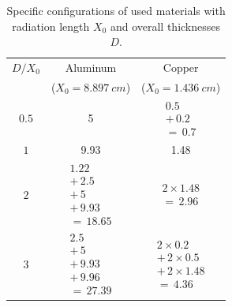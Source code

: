 \documentclass[sn-mathphys-num,iicol]{sn-jnl}
\theoremstyle{thmstyleone}
\theoremstyle{thmstyletwo}
\theoremstyle{thmstylethree}
\begin{document}
\begin{table}\centering
  \renewcommand*{\arraystretch}{1.15}
  \begin{tabular}{c|c|c}
    $D/X_0$ & Aluminum & Copper \\
    & {\fontsize{7}{5}\selectfont ($X_0=\SI{8.897}{cm}$)} & {\fontsize{7}{5}\selectfont ($X_0=\SI{1.436}{cm}$)} \\\hline\rule{0pt}{6ex}
    $0.5$ & \num{5} & $\begin{array}{r}
                \num{0.5} \\
                +\,\num{0.2} \\\hline
                =\,\num{0.7}    
              \end{array}$ \\\hline
    $1$ & \num{9.93} & \num{1.48} \\\hline
    $2$ & $\begin{array}{r}
      \num{1.22} \\
      +\,\num{2.5} \\
      +\,\num{5} \\
      +\,\num{9.93} \\\hline
      =\,\num{18.65}
    \end{array}$ & $\begin{array}{r}
                      2\times\num{1.48} \\\hline
                      =\,\num{2.96}
                    \end{array}$ \\\hline
    $3$ & $\begin{array}{r}
      \num{2.5} \\
      +\,\num{5} \\
      +\,\num{9.93} \\
      +\,\num{9.96} \\\hline
      =\,\num{27.39}
    \end{array}$ & $\begin{array}{r}
                      2\times\num{0.2} \\
                      +\,2\times\num{0.5} \\
                      +\,2\times\num{1.48} \\\hline
                      =\,\num{4.36}
                    \end{array}$ \\\hline
  \end{tabular}\vspace{3mm}
  \caption{Specific configurations of used materials with radiation length $X_0$ and overall thicknesses $D$.}
  \label{tab:config_materials}
\end{table}
\end{document}
